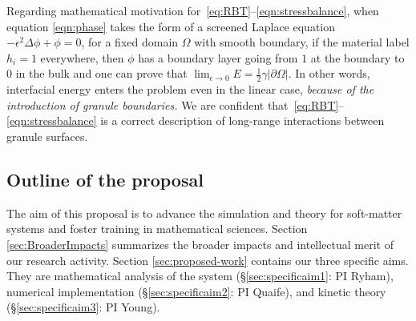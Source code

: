 Regarding mathematical motivation for~\eqref{eq:RBT}--\eqref{eqn:stressbalance},
when equation \eqref{eqn:phase} takes the form of a screened Laplace equation
$-\epsilon^2 \Delta \phi + \phi =0$, for a fixed domain $\Omega$ with
smooth boundary, if the material label $h_i = 1$
everywhere, then $\phi$ has a boundary layer going from $1$ at the
boundary to $0$ in the bulk and one can prove that 
$\lim_{\epsilon \to 0} E = \frac{1}{2}\gamma |\partial \Omega|$.
In other words, 
interfacial energy enters the problem even in the linear case,
\emph{because of the introduction of granule boundaries.}
We are confident
that~\eqref{eq:RBT}--\eqref{eqn:stressbalance} is a correct description
of long-range interactions between granule surfaces.


\subsection{Outline of the proposal}
The aim of this proposal is to advance the simulation
and theory for soft-matter systems
and foster training in mathematical sciences.
Section \ref{sec:BroaderImpacts} summarizes the broader
impacts and intellectual merit of our research activity.
Section \ref{sec:proposed-work} contains our
three specific aims.  They are
mathematical analysis of the system
(\S \ref{sec:specificaim1}: PI Ryham),
numerical implementation
(\S \ref{sec:specificaim2}: PI Quaife),
and  kinetic theory
(\S \ref{sec:specificaim3}: PI Young).



